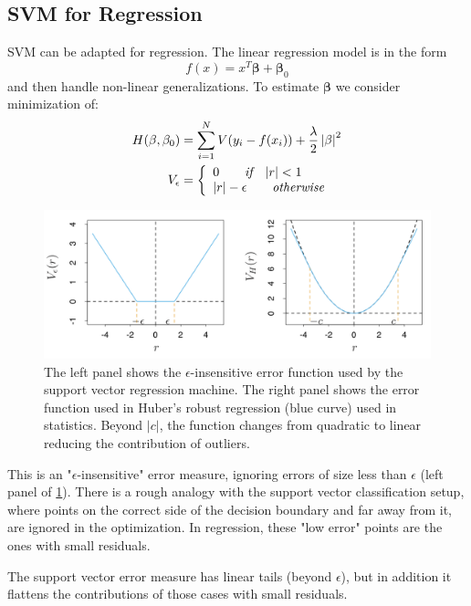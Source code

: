 \documentclass[12pt, letterpaper]{article}
\theoremstyle{definition}
\newcommand{\be}{\mathbf{\beta}}
\DeclarePairedDelimiter\autobracket{(}{)}
\newcommand{\br}[1]{\autobracket*{#1}}
\begin{document}
\subsection{SVM for Regression}
SVM can be adapted for regression. The linear regression model is in the form
\begin{equation}
f(x) = x^T\be+\be_0
\end{equation}
and then handle non-linear generalizations. To estimate $\be$ we consider minimization of:
\begin{equation}
\begin{aligned}
H(\be, \be_0) &= \sum_{i=1}^NV\br{y_i - f(x_i)}+\frac{\lambda}{2}\left|\be\right|^2\\
V_\epsilon &=\left\{\begin{array}{ll}0 \quad \quad \textit{if}\quad |r|<1 \\ 
 |r|-\epsilon  \quad \quad \textit{otherwise}
\end{array} 
\right.
\end{aligned}
\end{equation}
\begin{figure}
\centering
\includegraphics[scale=0.5]{img/RegSVMV}
\caption{The left panel shows the $\epsilon$-insensitive error function used by the support vector regression machine. The right panel shows the error function used in Huber’s robust regression (blue curve) used in statistics. Beyond $|c|$, the function changes from quadratic to linear reducing the contribution of outliers.}
\label{RegSVMV}
\end{figure}
This is an "$\epsilon$-insensitive" error measure, ignoring errors of size less than $\epsilon$ (left panel of \ref{RegSVMV}). There is a rough analogy with the support vector classification setup, where points on the correct side of the decision boundary and far away from it, are ignored in the optimization. In regression, these "low error" points are the ones with small residuals.

The support vector error measure has linear tails (beyond $\epsilon$), but in addition it flattens the contributions of those cases with small residuals.
\end{document}
